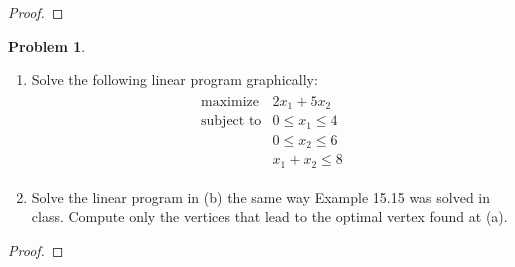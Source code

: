 \documentclass[12pt]{article}
\theoremstyle{definition}
\newtheorem{problem}{Problem}
\begin{document}
\begin{proof}
\end{proof}
\newpage


\begin{problem}
  \begin{enumerate}
    \item Solve the following linear program graphically:
      \begin{align*}
        \begin{array}{ll}
          \text{maximize} & 2x_1 + 5x_2 \\
          \text{subject to} & 0 \leq x_1 \leq 4 \\
          & 0 \leq x_2 \leq 6 \\
          & x_1 + x_2 \leq 8
        \end{array}
      \end{align*}
    \item Solve the linear program in (b) the same way Example 15.15 was solved in class.
      Compute only the vertices that lead to the optimal vertex found at (a).
  \end{enumerate}
\end{problem}

\begin{proof}
\end{proof}
\end{document}
